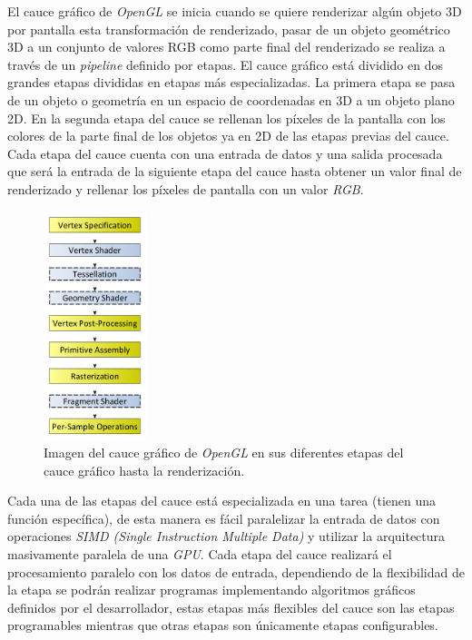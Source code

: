 \documentclass[a4paper]{book}
\begin{document}
El cauce gráfico de \textit{OpenGL} se inicia cuando se quiere renderizar algún objeto 3D por pantalla esta transformación de renderizado,
pasar de un objeto geométrico 3D a un conjunto de valores RGB como parte final del renderizado se realiza a través de un \textit{pipeline}
definido por etapas. El cauce gráfico está dividido en dos grandes etapas divididas en etapas más especializadas. La primera etapa se
pasa de un objeto o geometría en un espacio de coordenadas en 3D a un objeto plano 2D. En la segunda etapa del cauce se rellenan los píxeles
de la pantalla con los colores de la parte final de los objetos ya en 2D de las etapas previas del cauce. Cada etapa del cauce cuenta con una
entrada de datos y una salida procesada que será la entrada de la siguiente etapa del cauce hasta obtener un valor final de renderizado
y rellenar los píxeles de pantalla con un valor \textit{RGB}.

\begin{figure}[H]
    \centering
    \includegraphics[width=3cm, keepaspectratio]{img/RenderingPipeline.png}
    \caption{Imagen del cauce gráfico de \textit{OpenGL} en sus diferentes etapas del cauce gráfico hasta la renderización.}
    \label{RenderingPipeline}
\end{figure}

Cada una de las etapas del cauce está especializada en una tarea (tienen una función específica), de esta manera es fácil
paralelizar la entrada de datos con operaciones \textit{SIMD (Single Instruction Multiple Data)} y utilizar la arquitectura masivamente
paralela de una \textit{GPU}. Cada etapa del cauce realizará el procesamiento paralelo con los datos de entrada, dependiendo de la
flexibilidad de la etapa se podrán realizar programas implementando algoritmos gráficos definidos por el desarrollador,
estas etapas más flexibles del cauce son las etapas programables mientras que otras etapas son únicamente etapas configurables.
\end{document}
